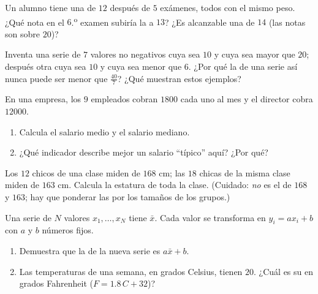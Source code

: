 \begin{exercise}[$\star\star$]\label{exo:g10:stats:5}
Un alumno tiene una  de $12$ después de $5$ exámenes, todos con el
mismo peso. ¿Qué nota en el $6$.\textsuperscript{o} examen subiría la
 a $13$? ¿Es alcanzable una  de $14$ (las notas son sobre
$20$)?
\end{exercise}

\begin{exercise}[$\star\star$]\label{exo:g10:stats:6}
Inventa una serie de $7$ valores no negativos cuya  sea $10$ y cuya
 sea mayor que $20$; después otra cuya  sea $10$ y cuya 
sea menor que $6$. ¿Por qué la  de una serie así nunca puede ser
menor que $\frac{40}{7}$? ¿Qué muestran estos ejemplos?
\end{exercise}

\begin{exercise}[$\star\star$]\label{exo:g10:stats:7}
En una empresa, los $9$ empleados cobran $1800$ cada uno al mes y el
director cobra $12000$.
\begin{enumerate}
  \item Calcula el salario medio y el salario mediano.
  \item ¿Qué indicador describe mejor un salario ``típico'' aquí? ¿Por
        qué?
\end{enumerate}
\end{exercise}

\begin{exercise}[$\star\star$]\label{exo:g10:stats:8}
Los $12$ chicos de una clase miden de  $168$ cm; las $18$ chicas de
la misma clase miden de  $163$ cm. Calcula la estatura  de toda
la clase. (Cuidado: \emph{no} es el  de $168$ y $163$; hay que
ponderar las  por los tamaños de los grupos.)
\end{exercise}

\begin{exercise}[$\star\star\star$]\label{exo:g10:stats:9}
Una serie de $N$ valores $x_1, \dots, x_N$ tiene  $\bar x$. Cada
valor se transforma en $y_i = a x_i + b$ con $a$ y $b$ números fijos.
\begin{enumerate}
  \item Demuestra que la  de la nueva serie es $a \bar x + b$.
  \item Las temperaturas de una semana, en grados Celsius, tienen 
        $20$. ¿Cuál es su  en grados Fahrenheit
        ($F = 1.8\,C + 32$)?
\end{enumerate}
\end{exercise}

